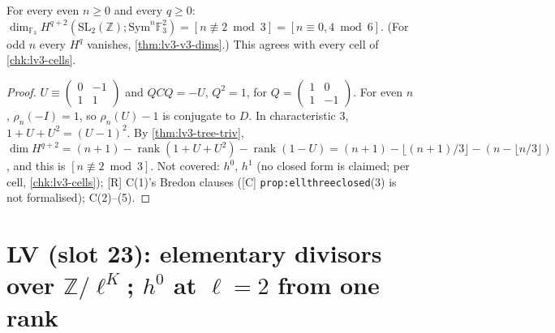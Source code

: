 \begin{theorem}[{{[R]} Theorem C(1): $\dim_{\mathbb F_3}H^q(\Gamma;\mathrm{Sym}^n\mathbb F_3^2)=[n\equiv0,4\bmod6]$, every even $n$, every $q\ge2$}]\label{thm:lg-c3-dims}
  \leanok
  For every even $n\ge0$ and every $q\ge0$:
  $\dim_{\mathbb F_3}H^{q+2}(\mathrm{SL}_2(\mathbb Z);\mathrm{Sym}^n\mathbb F_3^2)=[n\not\equiv2\bmod3]=[n\equiv0,4\bmod6]$.
  (For odd $n$ every $H^q$ vanishes, \ref{thm:lv3-v3-dims}.)  This agrees with every cell of \ref{chk:lv3-cells}.
\end{theorem}
\begin{proof}
  \leanok
  $U\equiv\begin{pmatrix}0&-1\\1&1\end{pmatrix}$ and $QCQ=-U$, $Q^2=1$, for $Q=\begin{pmatrix}1&0\\1&-1\end{pmatrix}$.  For even $n$, $\rho_n(-I)=1$,
  so $\rho_n(U)-1$ is conjugate to $D$.  In characteristic $3$, $1+U+U^2=(U-1)^2$.  By \ref{thm:lv3-tree-triv},
  $\dim H^{q+2}=(n+1)-\operatorname{rank}(1+U+U^2)-\operatorname{rank}(1-U)=(n+1)-\lfloor(n+1)/3\rfloor-(n-\lfloor n/3\rfloor)$, and this is
  $[n\not\equiv2\bmod3]$.  Not covered: $h^0$, $h^1$ (no closed form is claimed; per cell, \ref{chk:lv3-cells}); [R] C(1)'s Bredon
  clauses ([C] \texttt{prop:ellthreeclosed}(3) is not formalised); C(2)--(5).
\end{proof}

\section{LV (slot 23): elementary divisors over \texorpdfstring{$\mathbb Z/\ell^K$}{Z/l^K}; \texorpdfstring{$h^0$}{h0} at \texorpdfstring{$\ell=2$}{l = 2} from one rank}

